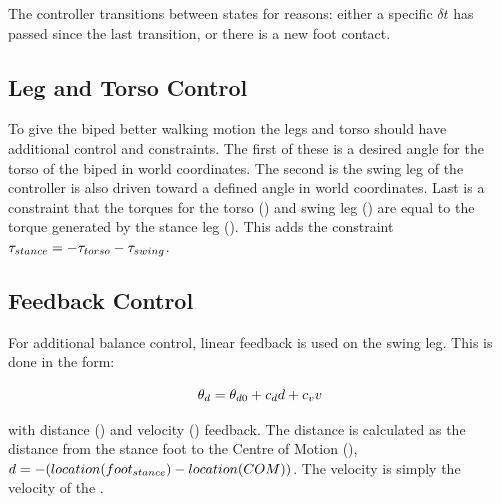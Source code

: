 The controller transitions between states for reasons: either a specific $\delta t$ has passed since the last transition, or there is a new foot contact.


\subsection{Leg and Torso Control}

To give the biped better walking motion the legs and torso should have additional control and constraints.
The first of these is a desired angle for the torso of the biped in world coordinates.
The second is the swing leg of the controller is also driven toward a defined angle in world coordinates.
Last is a constraint that the torques for the torso (\torqueTorso) and swing leg (\torqueSwing) are equal to the torque generated by the stance leg (\torqueStance). 
This adds the constraint $\tau_{stance} = -\tau_{torso} - \tau_{swing}$.

\subsection{Feedback Control}

For additional balance control, linear feedback is used on the swing leg. This is done in the form:

\begin{equation}
\label{equation:feedback-law}
	\theta_{d} = \theta_{d0} + c_{d} d + c_{v} v
\end{equation}

with distance (\distance) and velocity (\velocity) feedback.
The distance \distance is calculated as the distance from the stance foot to the Centre of Motion (\COM), $d = -(location(foot_{stance}) - location(COM))$.
The velocity \velocity is simply the velocity of the \COM.

